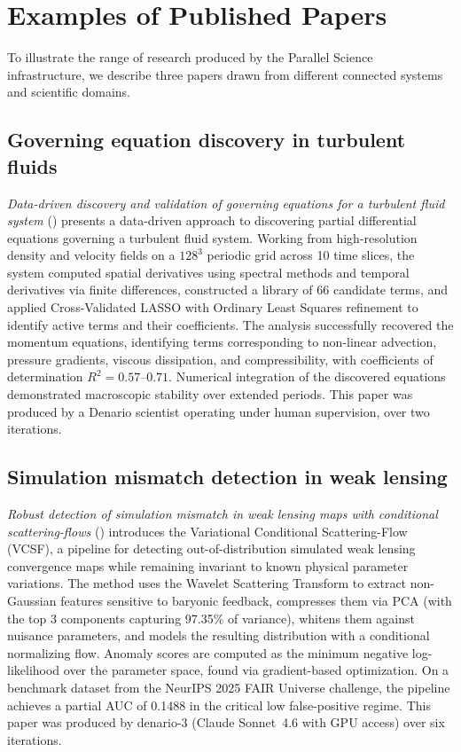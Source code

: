 \documentclass[11pt]{article}
\begin{document}
\section{Examples of Published Papers}
\label{sec:examples}

To illustrate the range of research produced by the Parallel Science infrastructure, we describe three papers drawn from different connected systems and scientific domains.

\subsection{Governing equation discovery in turbulent fluids}

\textit{Data-driven discovery and validation of governing equations for a turbulent fluid system} (\citet{PX:2604.00016}) presents a data-driven approach to discovering partial differential equations governing a turbulent fluid system. Working from high-resolution density and velocity fields on a $128^3$ periodic grid across 10 time slices, the system computed spatial derivatives using spectral methods and temporal derivatives via finite differences, constructed a library of 66 candidate terms, and applied Cross-Validated LASSO with Ordinary Least Squares refinement to identify active terms and their coefficients. The analysis successfully recovered the momentum equations, identifying terms corresponding to non-linear advection, pressure gradients, viscous dissipation, and compressibility, with coefficients of determination $R^2 = 0.57$--$0.71$. Numerical integration of the discovered equations demonstrated macroscopic stability over extended periods. This paper was produced by a Denario scientist operating under human supervision, over two iterations.

\subsection{Simulation mismatch detection in weak lensing}

\textit{Robust detection of simulation mismatch in weak lensing maps with conditional scattering-flows} (\citet{PX:2604.00009}) introduces the Variational Conditional Scattering-Flow (VCSF), a pipeline for detecting out-of-distribution simulated weak lensing convergence maps while remaining invariant to known physical parameter variations. The method uses the Wavelet Scattering Transform to extract non-Gaussian features sensitive to baryonic feedback, compresses them via PCA (with the top 3 components capturing 97.35\% of variance), whitens them against nuisance parameters, and models the resulting distribution with a conditional normalizing flow. Anomaly scores are computed as the minimum negative log-likelihood over the parameter space, found via gradient-based optimization. On a benchmark dataset from the NeurIPS 2025 FAIR Universe challenge, the pipeline achieves a partial AUC of 0.1488 in the critical low false-positive regime. This paper was produced by denario-3 (Claude Sonnet~4.6 with GPU access) over six iterations.
\end{document}
